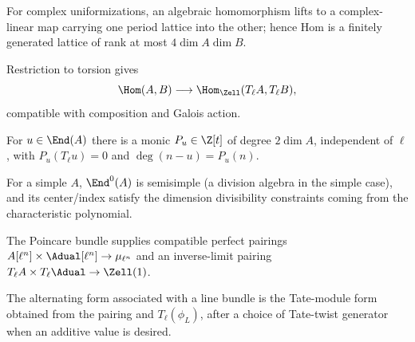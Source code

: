 \begin{proposition}
\label{mumford-iv19-complex-hom-lattice}
For complex uniformizations, an algebraic homomorphism lifts to a complex-linear
map carrying one period lattice into the other; hence Hom is a finitely
generated lattice of rank at most $4\dim A\dim B$.
\notready
\end{proposition}

\begin{definition}
\label{mumford-iv19-ladic-representation}
Restriction to torsion gives
\[
 \Hom(A,B)\longrightarrow\Hom_{\Zell}(T_\ell A,T_\ell B),
\]
compatible with composition and Galois action.
\notready
\end{definition}

\begin{theorem}
\label{mumford-iv19-end-characteristic-polynomial}
For $u\in\End(A)$ there is a monic $P_u\in\Z[t]$ of degree $2\dim A$,
independent of $\ell$, with $P_u(T_\ell u)=0$ and
$\deg(n-u)=P_u(n)$.
\notready
\end{theorem}

\begin{theorem}
\label{mumford-iv19-simple-endomorphism-algebra}
For a simple $A$, $\End^0(A)$ is semisimple (a division algebra in the simple
case), and its center/index satisfy the dimension divisibility constraints
coming from the characteristic polynomial.
\notready
\end{theorem}

\begin{definition}
\label{mumford-iv20-tate-pairing}
The Poincare bundle supplies compatible perfect pairings
$A[\ell^n]\times\Adual[\ell^n]\to\mu_{\ell^n}$ and an inverse-limit pairing
$T_\ell A\times T_\ell\Adual\to\Zell(1)$.
\notready
\end{definition}

\begin{definition}
\label{mumford-iv20-riemann-form-definition}
The alternating form associated with a line bundle is the Tate-module form
obtained from the pairing and $T_\ell(\phi_L)$, after a choice of Tate-twist
generator when an additive value is desired.
\notready
\end{definition}

